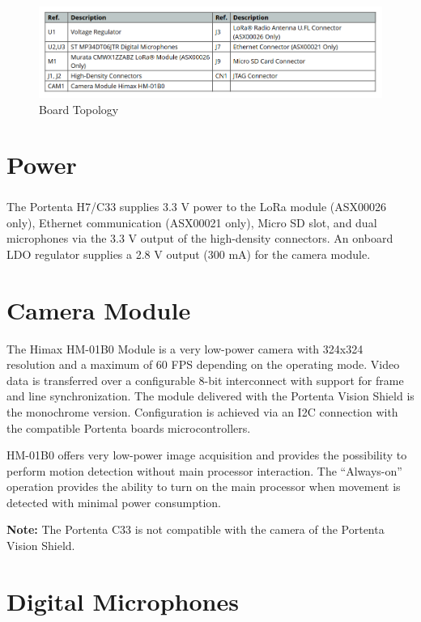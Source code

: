 \begin{figure}
	\begin{center}
		\includegraphics[width=0.7\linewidth]{Images/VisionShield/Discription.png}
		\caption{Board Topology}
		\label{BoardTopology}
	\end{center}
\end{figure}

	
	\section{Power}
	
	The Portenta H7/C33 supplies 3.3 V power to the LoRa\textsuperscript{\textregistered} module (ASX00026 only), Ethernet communication (ASX00021 only), Micro SD slot, and dual microphones via the 3.3 V output of the high-density connectors. An onboard LDO regulator supplies a 2.8 V output (300 mA) for the camera module.
	
	\section{Camera Module}
	
	The Himax HM-01B0 Module is a very low-power camera with 324x324 resolution and a maximum of 60 FPS depending on the operating mode. Video data is transferred over a configurable 8-bit interconnect with support for frame and line synchronization. The module delivered with the Portenta Vision Shield is the monochrome version. Configuration is achieved via an I2C connection with the compatible Portenta boards microcontrollers.
	
	HM-01B0 offers very low-power image acquisition and provides the possibility to perform motion detection without main processor interaction. The “Always-on” operation provides the ability to turn on the main processor when movement is detected with minimal power consumption.
	
	\textbf{Note:} The Portenta C33 is not compatible with the camera of the Portenta Vision Shield.
	
	\section{Digital Microphones}
	
